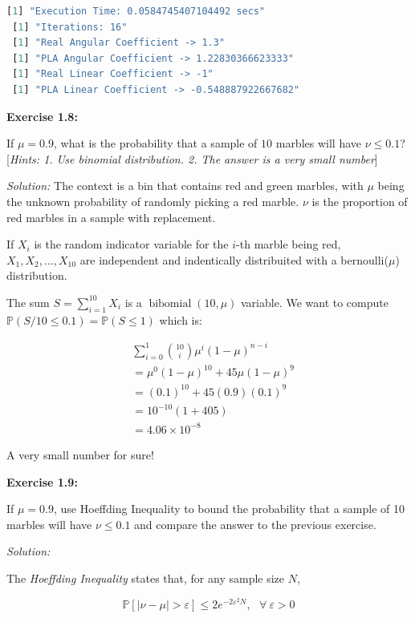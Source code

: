 \documentclass[12pt,letterpaper]{article}
\begin{document}
		 \begin{lstlisting}[language=R]
 [1] "Execution Time: 0.0584745407104492 secs"
 [1] "Iterations: 16"
 [1] "Real Angular Coefficient -> 1.3"
 [1] "PLA Angular Coefficient -> 1.22830366623333"
 [1] "Real Linear Coefficient -> -1"
 [1] "PLA Linear Coefficient -> -0.548887922667682"
		 \end{lstlisting}
		 
		 \textbf{Exercise 1.8:}
		 
		 If $\mu=0.9$, what is the probability that a sample of $10$ marbles will have $\nu\leq 0.1$? [\emph{Hints: 1. Use binomial distribution. 2. The answer is a very small number}]
		 
		 \textit{Solution: } The context is a bin that contains red and green marbles, with $\mu$ being the unknown probability of randomly picking a red marble. $\nu$ is the proportion of red marbles in a sample with replacement.
		 
		 If $X_i$ is the random indicator variable for the $i$-th marble being red, $X_1,X_2,...,X_10$ are independent and indentically distribuited with a bernoulli($\mu$) distribution.
		 
		 The sum $S=\sum_{i=1}^{10}X_i$ is a $\operatorname{bibomial}(10,\mu)$ variable. We want to compute $\mathbb{P}(S/10\leq 0.1)=\mathbb{P}(S\leq 1)$ which is:
		 
		 \begin{align*}
		 &\displaystyle\sum_{i=0}^{1}{10 \choose i}\mu^i(1-\mu)^{n-i}\\
		 &=\mu^0(1-\mu)^{10}+45\mu(1-\mu)^9\\
		 &=(0.1)^{10}+45(0.9)(0.1)^9\\
		 &=10^{-10}(1+405)\\
		 &=4.06\times 10^{-8}
		 \end{align*}
		 
		 A very small number for sure!
		 
	\textbf{Exercise 1.9:}
	
	If $\mu=0.9$, use Hoeffding Inequality to bound the probability that a sample of 10 marbles will have $\nu\leq 0.1$ and compare the answer to the previous exercise.
	
	\textit{Solution:} 
	
	The \textit{Hoeffding Inequality}\cite{yaser2012learning} states that, for any sample size $N$,
	
	$$\mathbb{P}[|\nu-\mu|>\varepsilon]\leq2 e^{-2\varepsilon^2N},~~~\forall~\varepsilon>0$$
	
\end{document}
